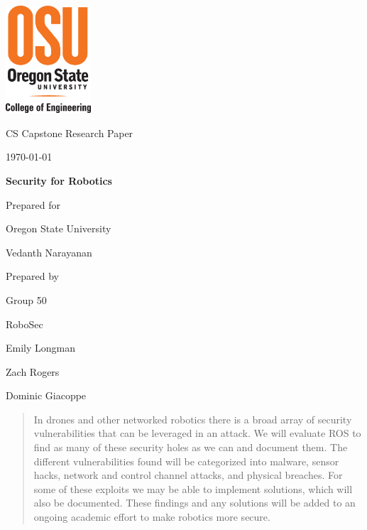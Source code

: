 \documentclass[IEEEtran,letterpaper,10pt,notitlepage,draftclsnofoot]{article}
\def \CapstoneTeamName{   RoboSec}
\def \CapstoneTeamNumber{   50}
\def \GroupMemberOne{     Emily Longman}
\def \GroupMemberTwo{     Zach Rogers}
\def \GroupMemberThree{     Dominic Giacoppe}
\def \CapstoneProjectName{    Security for Robotics}
\def \CapstoneSponsorCompany{ Oregon State University}
\def \CapstoneSponsorPerson{    Vedanth Narayanan}
\def \DocType{    %
        Research Paper
        }
\newcommand{\NameSigPair}[1]{\par
\makebox[2.75in][r]{#1} \hfil   \makebox[3.25in]{\makebox[2.25in]{\hrulefill} \hfill    \makebox[.75in]{\hrulefill}}
\par\vspace{-12pt} \textit{\tiny\noindent
\makebox[2.75in]{} \hfil    \makebox[3.25in]{\makebox[2.25in][r]{Signature} \hfill  \makebox[.75in][r]{Date}}}}
\renewcommand{\NameSigPair}[1]{#1}
\begin{document}
\begin{titlepage}
    \begin{singlespace}
      \includegraphics[height=4cm]{coe_v_spot1}
        \hfill
        \par\vspace{.2in}
        \centering
        \scshape{
            \huge CS Capstone \DocType \par
            {\large\today}\par
            \vspace{.5in}
            \textbf{\Huge\CapstoneProjectName}\par
            \vfill
            {\large Prepared for}\par
            \Huge \CapstoneSponsorCompany\par
            \vspace{10pt}
            {\Large\NameSigPair{\CapstoneSponsorPerson}\par}
            {\large Prepared by }\par
            Group\CapstoneTeamNumber\par
            \CapstoneTeamName\par
            \vspace{10pt}
            {\Large
                \NameSigPair{\GroupMemberOne}\par
                \NameSigPair{\GroupMemberTwo}\par
                \NameSigPair{\GroupMemberThree}\par
            }
            \vspace{20pt}
        }
        \begin{abstract}
          In drones and other networked robotics there is a broad array of security vulnerabilities that can be leveraged in an attack.
          We will evaluate ROS to find as many of these security holes as we can and document them.
          The different vulnerabilities found will be categorized into malware, sensor hacks, network and control channel attacks, and physical breaches.
          For some of these exploits we may be able to implement solutions, which will also be documented.
          These findings and any solutions will be added to an ongoing academic effort to make robotics more secure.
        \end{abstract}
    \end{singlespace}
\end{titlepage}
\end{document}
